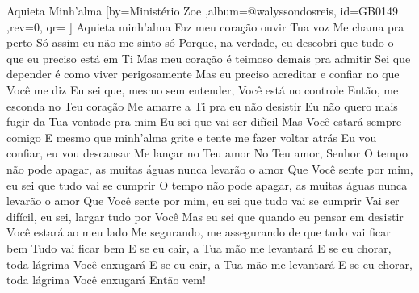 \beginsong
{Aquieta Minh'alma %
}[by={Ministério Zoe %
},album={@walyssondosreis},
id={GB0149 %
},rev={0}, %
qr={ %
}]
\beginchorus
Aquieta minh'alma
Faz meu coração ouvir Tua voz
Me chama pra perto
Só assim eu não me sinto só
\endchorus
\beginverse*
Porque, na verdade, eu descobri que tudo o que eu preciso está em Ti
Mas meu coração é teimoso demais pra admitir
Sei que depender é como viver perigosamente
Mas eu preciso acreditar e confiar no que Você me diz
\endverse
\beginverse*
Eu sei que, mesmo sem entender, Você está no controle
Então, me esconda no Teu coração
Me amarre a Ti pra eu não desistir
\endverse
\beginverse*
Eu não quero mais fugir da Tua vontade pra mim
Eu sei que vai ser difícil
Mas Você estará sempre comigo
\endverse
\beginverse*
E mesmo que minh'alma grite e tente me fazer voltar atrás
Eu vou confiar, eu vou descansar
Me lançar no Teu amor
No Teu amor, Senhor
\endverse
\beginverse*
O tempo não pode apagar, as muitas águas nunca levarão o amor
Que Você sente por mim, eu sei que tudo vai se cumprir
O tempo não pode apagar, as muitas águas nunca levarão o amor
Que Você sente por mim, eu sei que tudo vai se cumprir
\endverse
\beginverse*
Vai ser difícil, eu sei, largar tudo por Você
Mas eu sei que quando eu pensar em desistir
Você estará ao meu lado
Me segurando, me assegurando de que tudo vai ficar bem
Tudo vai ficar bem
\endverse
\beginverse*
E se eu cair, a Tua mão me levantará
E se eu chorar, toda lágrima Você enxugará
E se eu cair, a Tua mão me levantará
E se eu chorar, toda lágrima Você enxugará
Então vem!
\endverse

